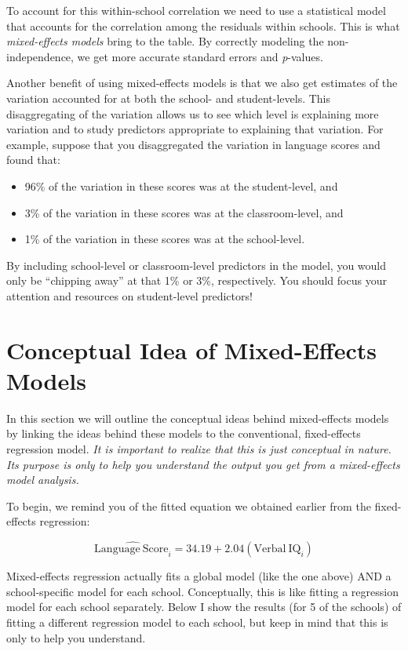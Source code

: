 \documentclass[]{book}
\providecommand{\tightlist}{%
  \setlength{\itemsep}{0pt}\setlength{\parskip}{0pt}}
\begin{document}
To account for this within-school correlation we need to use a statistical model that accounts for the correlation among the residuals within schools. This is what \emph{mixed-effects models} bring to the table. By correctly modeling the non-independence, we get more accurate standard errors and \emph{p}-values.

Another benefit of using mixed-effects models is that we also get estimates of the variation accounted for at both the school- and student-levels. This disaggregating of the variation allows us to see which level is explaining more variation and to study predictors appropriate to explaining that variation. For example, suppose that you disaggregated the variation in language scores and found that:

\begin{itemize}
\tightlist
\item
  96\% of the variation in these scores was at the student-level, and
\item
  3\% of the variation in these scores was at the classroom-level, and
\item
  1\% of the variation in these scores was at the school-level.
\end{itemize}

By including school-level or classroom-level predictors in the model, you would only be ``chipping away'' at that 1\% or 3\%, respectively. You should focus your attention and resources on student-level predictors!

\hypertarget{conceptual-idea-of-mixed-effects-models}{%
\section{Conceptual Idea of Mixed-Effects Models}\label{conceptual-idea-of-mixed-effects-models}}

In this section we will outline the conceptual ideas behind mixed-effects models by linking the ideas behind these models to the conventional, fixed-effects regression model. \emph{It is important to realize that this is just conceptual in nature. Its purpose is only to help you understand the output you get from a mixed-effects model analysis.}

To begin, we remind you of the fitted equation we obtained earlier from the fixed-effects regression:

\[
\hat{\mathrm{Language~Score}_i} = 34.19 + 2.04(\mathrm{Verbal~IQ}_i)
\]

Mixed-effects regression actually fits a global model (like the one above) AND a school-specific model for each school. Conceptually, this is like fitting a regression model for each school separately. Below I show the results (for 5 of the schools) of fitting a different regression model to each school, but keep in mind that this is only to help you understand.
\end{document}
